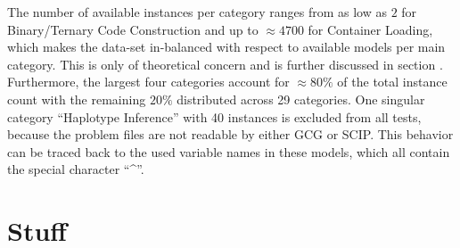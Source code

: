 		The number of available instances per category ranges from as low as $2$ for Binary/Ternary Code Construction and up to $\approx 4700$ for Container Loading, which makes the data-set in-balanced with respect to available models per main category. This is only of theoretical concern and is further discussed in section .
		Furthermore, the largest four categories account for $\approx 80\%$ of the total instance count with the remaining $20\%$ distributed across 29 categories.
		One singular category \enquote{Haplotype Inference} with 40 instances is excluded from all tests, because the problem files are not readable by either \acs{GCG} or \acs{SCIP}. This behavior can be traced back to the used variable names in these models, which all contain the special character \enquote{\^}.
	
	\section{Stuff}
